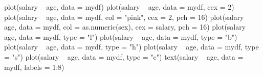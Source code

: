 \begin{Schunk}
\begin{Sinput}
 plot(salary ~ age, data = mydf)
 plot(salary ~ age, data = mydf, cex = 2)
 plot(salary ~ age, data = mydf, col = "pink", cex = 2, pch = 16)
 plot(salary ~ age, data = mydf, col = as.numeric(sex), cex = salary, pch = 16)
 plot(salary ~ age, data = mydf, type = "l")
 plot(salary ~ age, data = mydf, type = "b")
 plot(salary ~ age, data = mydf, type = "h")
 plot(salary ~ age, data = mydf, type = "s")
 plot(salary ~ age, data = mydf, type = "c")
 text(salary ~ age, data = mydf, labels = 1:8)
\end{Sinput}
\end{Schunk}
